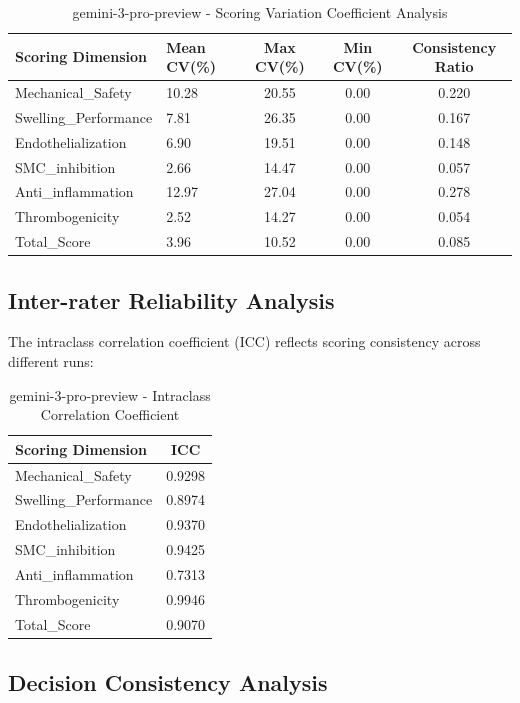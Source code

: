\documentclass[12pt,a4paper]{article}
\begin{document}
\begin{table}[H]
\centering
\caption{gemini-3-pro-preview - Scoring Variation Coefficient Analysis}
\begin{tabular}{llccc}
\toprule
\textbf{Scoring Dimension} & \textbf{Mean CV(\%)} & \textbf{Max CV(\%)} & \textbf{Min CV(\%)} & \textbf{Consistency Ratio} \\
\midrule
Mechanical\_Safety & 10.28 & 20.55 & 0.00 & 0.220 \\
Swelling\_Performance & 7.81 & 26.35 & 0.00 & 0.167 \\
Endothelialization & 6.90 & 19.51 & 0.00 & 0.148 \\
SMC\_inhibition & 2.66 & 14.47 & 0.00 & 0.057 \\
Anti\_inflammation & 12.97 & 27.04 & 0.00 & 0.278 \\
Thrombogenicity & 2.52 & 14.27 & 0.00 & 0.054 \\
Total\_Score & 3.96 & 10.52 & 0.00 & 0.085 \\
\bottomrule
\end{tabular}
\end{table}

\subsection{Inter-rater Reliability Analysis}

The intraclass correlation coefficient (ICC) reflects scoring consistency across different runs:

\begin{table}[H]
\centering
\caption{gemini-3-pro-preview - Intraclass Correlation Coefficient}
\begin{tabular}{lc}
\toprule
\textbf{Scoring Dimension} & \textbf{ICC} \\
\midrule
Mechanical\_Safety & 0.9298 \\
Swelling\_Performance & 0.8974 \\
Endothelialization & 0.9370 \\
SMC\_inhibition & 0.9425 \\
Anti\_inflammation & 0.7313 \\
Thrombogenicity & 0.9946 \\
Total\_Score & 0.9070 \\
\bottomrule
\end{tabular}
\end{table}

\subsection{Decision Consistency Analysis}
\end{document}
